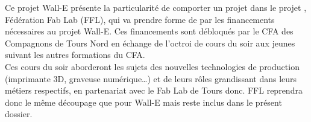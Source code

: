 Ce projet Wall-E présente la particularité de comporter un \og projet dans le projet \fg{}, \og Fédération Fab Lab \fg{} (FFL), qui va prendre forme de par les financements nécessaires au projet Wall-E. Ces financements sont débloqués par le CFA des Compagnons de Tours Nord \og en échange \fg{} de l'octroi de cours du soir aux jeunes suivant les autres formations du CFA.\\
Ces cours du soir aborderont les sujets des nouvelles technologies de production (imprimante 3D, graveuse numérique\ldots) et de leurs rôles grandissant dans leurs métiers respectifs, en partenariat avec le Fab Lab de Tours donc. FFL reprendra donc le même découpage que pour Wall-E mais reste inclus dans le présent dossier.

%

